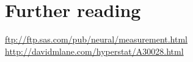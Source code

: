 \documentclass[a4paper,12pt,oneside,leqno]{scrartcl}%
\newcommand{\terminus}[1]{\textsc{#1}}
\newcommand{\mybox}[1]{\framebox[\textwidth]{\begin{minipage}[c]{0.99\textwidth}#1\end{minipage}}}
\begin{document}

\section{Further reading}
 \url{ftp://ftp.sas.com/pub/neural/measurement.html} \\
 \url{http://davidmlane.com/hyperstat/A30028.html} \\
\citet{stevens1951a}




\end{document}
